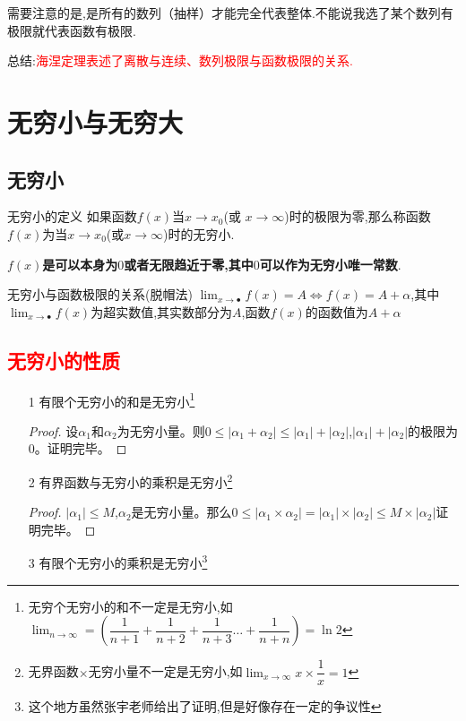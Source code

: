 \documentclass[12pt, a4paper, oneside, UTF8]{ctexbook}
\begin{document}
\begin{sloppypar}
\begin{center}
    \end{center}
    需要注意的是,是所有的数列（抽样）才能完全代表整体.不能说我选了某个数列有极限就代表函数有极限.

    总结:\textcolor{red}{海涅定理表述了离散与连续、数列极限与函数极限的关系.}
    \section{无穷小与无穷大}
    \subsection{无穷小}
    \begin{defn}{无穷小的定义}{}
        如果函数$f(x)$当$x\to x_0$(或 $x\to\infty$)时的极限为零,那么称函数$f(x)$为当$x\to x_0$(或$x\to\infty$)时的无穷小.
    \end{defn}
    \textbf{$f(x)$是可以本身为$0$或者无限趋近于零,其中$0$可以作为无穷小唯一常数}.
    \begin{criterion}{无穷小与函数极限的关系(脱帽法)}{}
        $\lim_{x\to\bullet}f(x)=A\Leftrightarrow f(x)=A+\alpha$,其中$\lim_{x\to\bullet}f(x)$为超实数值,其实数部分为$A$,函数$f(x)$的函数值为$A+\alpha$\label{wqx1}
    \end{criterion}
    \subsection{\textcolor{red}{无穷小的性质}}
    \begin{itemize}
        \item[1] 有限个无穷小的和是无穷小\footnote{无穷个无穷小的和不一定是无穷小,如$\lim_{n \to \infty}=(\dfrac{1}{n+1}+\dfrac{1}{n+2}+\dfrac{1}{n+3}\dots +\dfrac{1}{n+n})=\ln 2$}
            \begin{proof}
                设$\alpha_1$和$\alpha_2$为无穷小量。则$0 \leqslant |\alpha_1+\alpha_2|\leqslant |\alpha_1|+|\alpha_2|$,$|\alpha_1|+|\alpha_2|$的极限为0。证明完毕。
            \end{proof}
        \item[2] 有界函数与无穷小的乘积是无穷小\footnote{无界函数$\times$无穷小量不一定是无穷小,如$\lim_{x \to \infty}x \times \dfrac{1}{x}=1$}
            \begin{proof}
                $|\alpha _1|\leqslant M$,$\alpha_2$是无穷小量。那么$0\leqslant|\alpha_1 \times \alpha_2|=|\alpha_1|\times |\alpha_2|\leqslant M \times |\alpha_2|$证明完毕。
            \end{proof}
        \item[3] 有限个无穷小的乘积是无穷小\footnote{这个地方虽然张宇老师给出了证明,但是好像存在一定的争议性}
    \end{itemize}

\end{sloppypar}
\end{document}

